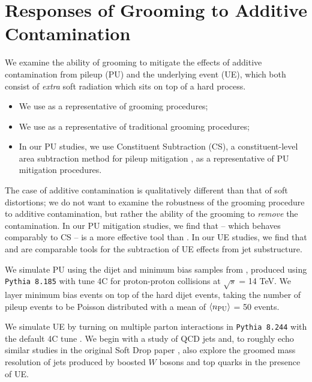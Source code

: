 \documentclass[letterpaper,11pt]{article}
\begin{document}
\section{Responses of Grooming to Additive Contamination}
\label{sec:add_contam}

We examine the ability of \PIRANHA{} grooming to mitigate the effects of additive contamination from pileup (PU) and the underlying event (UE), which both consist of \textit{extra} soft radiation which sits on top of a hard process.
%
\begin{itemize}
    \item We use  as a representative of \PIRANHA{} grooming procedures;
    \item We use  as a representative of traditional grooming procedures;
    \item In our PU studies, we use Constituent Subtraction (CS), a constituent-level area subtraction method for pileup mitigation \cite{Berta:2014eza}, as a representative of PU mitigation procedures.
\end{itemize}
%
The case of additive contamination is qualitatively different than that of soft distortions;
%
we do not want to examine the robustness of the grooming procedure to additive contamination, but rather the ability of the grooming to \textit{remove} the contamination.
%
In our PU mitigation studies, we find that  -- which behaves comparably to CS -- is a more effective tool than .
%
In our UE studies, we find that  and  are comparable tools for the subtraction of UE effects from jet substructure.

We simulate PU using the dijet and minimum bias samples from , produced using \texttt{Pythia 8.185} with tune 4C for proton-proton collisions at \(\sqrt{s}\) = 14 TeV.
%
We layer minimum bias events on top of the hard dijet events, taking the number of pileup events to be Poisson distributed with a mean of \(\langle n_{\rm PU}\rangle\) = 50 events.

We simulate UE by turning on multiple parton interactions in \texttt{Pythia 8.244} \cite{Sjostrand:2014zea} with the default 4C tune \cite{Corke:2010yf}.
%
We begin with a study of QCD jets and, to roughly echo similar studies in the original Soft Drop paper \cite{Larkoski:2014wba}, also explore the groomed mass resolution of jets produced by boosted \(W\) bosons and top quarks in the presence of UE.
\end{document}
